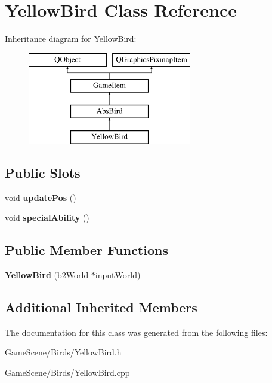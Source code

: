 \hypertarget{classYellowBird}{}\section{Yellow\+Bird Class Reference}
\label{classYellowBird}
Inheritance diagram for Yellow\+Bird\+:\begin{figure}[H]
\begin{center}
\leavevmode
\includegraphics[height=4.000000cm]{classYellowBird}
\end{center}
\end{figure}
\subsection*{Public Slots}
\begin{DoxyCompactItemize}
\item 
void {\bfseries update\+Pos} ()\hypertarget{classYellowBird_a6c3ceb34f93c373fdb708242b187c61f}{}\label{classYellowBird_a6c3ceb34f93c373fdb708242b187c61f}

\item 
void {\bfseries special\+Ability} ()\hypertarget{classYellowBird_ac0d2338bebfc57cc7b524d185bbfe721}{}\label{classYellowBird_ac0d2338bebfc57cc7b524d185bbfe721}

\end{DoxyCompactItemize}
\subsection*{Public Member Functions}
\begin{DoxyCompactItemize}
\item 
{\bfseries Yellow\+Bird} (b2\+World $\ast$input\+World)\hypertarget{classYellowBird_ac32d1c19aff515544d98cbe08adfc4c2}{}\label{classYellowBird_ac32d1c19aff515544d98cbe08adfc4c2}

\end{DoxyCompactItemize}
\subsection*{Additional Inherited Members}


The documentation for this class was generated from the following files\+:\begin{DoxyCompactItemize}
\item 
Game\+Scene/\+Birds/Yellow\+Bird.\+h\item 
Game\+Scene/\+Birds/Yellow\+Bird.\+cpp\end{DoxyCompactItemize}
